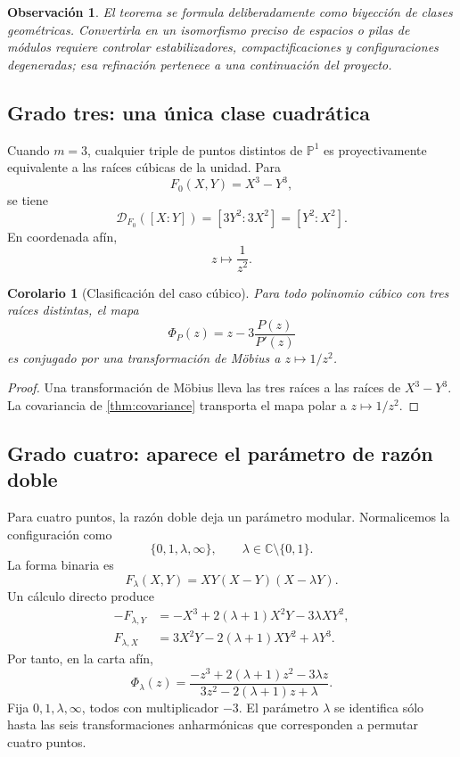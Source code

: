 \documentclass[11pt,oneside]{scrartcl}
\theoremstyle{plainblue}
\newtheorem{corollary}[theorem]{Corolario}
\theoremstyle{definitionblue}
\theoremstyle{remarkgray}
\newtheorem{remark}[theorem]{Observación}
\newcommand{\CC}{\mathbb{C}}
\newcommand{\PP}{\mathbb{P}}
\newcommand{\cD}{\mathcal{D}}
\begin{document}
\begin{remark}
El teorema se formula deliberadamente como biyección de clases geométricas. Convertirla
en un isomorfismo preciso de espacios o pilas de módulos requiere controlar
estabilizadores, compactificaciones y configuraciones degeneradas; esa refinación
pertenece a una continuación del proyecto.
\end{remark}

\subsection{Grado tres: una única clase cuadrática}

Cuando \(m=3\), cualquier triple de puntos distintos de \(\PP^1\) es proyectivamente
equivalente a las raíces cúbicas de la unidad. Para
\[
F_0(X,Y)=X^3-Y^3,
\]
se tiene
\[
\cD_{F_0}([X:Y])=[3Y^2:3X^2]=[Y^2:X^2].
\]
En coordenada afín,
\[
z\longmapsto\frac1{z^2}.
\]

\begin{corollary}[Clasificación del caso cúbico]\label{cor:cubic-conjugacy}
Para todo polinomio cúbico con tres raíces distintas, el mapa
\[
\Phi_P(z)=z-3\frac{P(z)}{P'(z)}
\]
es conjugado por una transformación de Möbius a \(z\mapsto1/z^2\).
\end{corollary}

\begin{proof}
Una transformación de Möbius lleva las tres raíces a las raíces de \(X^3-Y^3\). La
covariancia de \cref{thm:covariance} transporta el mapa polar a
\(z\mapsto1/z^2\).
\end{proof}

\subsection{Grado cuatro: aparece el parámetro de razón doble}

Para cuatro puntos, la razón doble deja un parámetro modular. Normalicemos la
configuración como
\[
\{0,1,\lambda,\infty\},
\qquad \lambda\in\CC\setminus\{0,1\}.
\]
La forma binaria es
\[
F_\lambda(X,Y)=XY(X-Y)(X-\lambda Y).
\]
Un cálculo directo produce
\begin{align}
-F_{\lambda,Y}
&=-X^3+2(\lambda+1)X^2Y-3\lambda XY^2,\\
F_{\lambda,X}
&=3X^2Y-2(\lambda+1)XY^2+\lambda Y^3.
\end{align}
Por tanto, en la carta afín,
\begin{equation}\label{eq:quartic-normal-map}
\Phi_\lambda(z)=
\frac{-z^3+2(\lambda+1)z^2-3\lambda z}
{3z^2-2(\lambda+1)z+\lambda}.
\end{equation}
Fija \(0,1,\lambda,\infty\), todos con multiplicador \(-3\). El parámetro
\(\lambda\) se identifica sólo hasta las seis transformaciones anharmónicas que
corresponden a permutar cuatro puntos.
\end{document}

